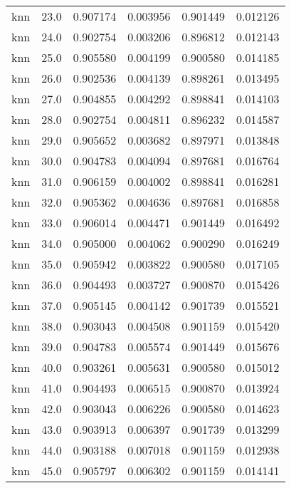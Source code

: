 \begin{tabular}{lrrrrr}
     knn &       23.0 &    0.907174 &   0.003956 &   0.901449 &  0.012126 \\
     knn &       24.0 &    0.902754 &   0.003206 &   0.896812 &  0.012143 \\
     knn &       25.0 &    0.905580 &   0.004199 &   0.900580 &  0.014185 \\
     knn &       26.0 &    0.902536 &   0.004139 &   0.898261 &  0.013495 \\
     knn &       27.0 &    0.904855 &   0.004292 &   0.898841 &  0.014103 \\
     knn &       28.0 &    0.902754 &   0.004811 &   0.896232 &  0.014587 \\
     knn &       29.0 &    0.905652 &   0.003682 &   0.897971 &  0.013848 \\
     knn &       30.0 &    0.904783 &   0.004094 &   0.897681 &  0.016764 \\
     knn &       31.0 &    0.906159 &   0.004002 &   0.898841 &  0.016281 \\
     knn &       32.0 &    0.905362 &   0.004636 &   0.897681 &  0.016858 \\
     knn &       33.0 &    0.906014 &   0.004471 &   0.901449 &  0.016492 \\
     knn &       34.0 &    0.905000 &   0.004062 &   0.900290 &  0.016249 \\
     knn &       35.0 &    0.905942 &   0.003822 &   0.900580 &  0.017105 \\
     knn &       36.0 &    0.904493 &   0.003727 &   0.900870 &  0.015426 \\
     knn &       37.0 &    0.905145 &   0.004142 &   0.901739 &  0.015521 \\
     knn &       38.0 &    0.903043 &   0.004508 &   0.901159 &  0.015420 \\
     knn &       39.0 &    0.904783 &   0.005574 &   0.901449 &  0.015676 \\
     knn &       40.0 &    0.903261 &   0.005631 &   0.900580 &  0.015012 \\
     knn &       41.0 &    0.904493 &   0.006515 &   0.900870 &  0.013924 \\
     knn &       42.0 &    0.903043 &   0.006226 &   0.900580 &  0.014623 \\
     knn &       43.0 &    0.903913 &   0.006397 &   0.901739 &  0.013299 \\
     knn &       44.0 &    0.903188 &   0.007018 &   0.901159 &  0.012938 \\
     knn &       45.0 &    0.905797 &   0.006302 &   0.901159 &  0.014141 \\

\end{tabular}
